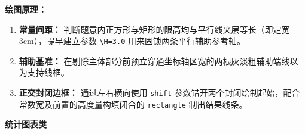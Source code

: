 \vspace{0.5cm}
\textbf{绘图原理：}
\begin{enumerate}
    \item \textbf{常量间距：} 判断题意内正方形与矩形的限高均与平行线夹层等长（即定宽 $3\text{cm}$），提早建立参数 \texttt{\textbackslash H=3.0} 用来固锁两条平行辅助参考轴。
    \item \textbf{辅助基准：} 在剔除主体部分前预立穿通坐标轴区宽的两根灰淡粗辅助端线以为支持线框。
    \item \textbf{正交封闭边框：} 通过左右横向使用 \texttt{shift} 参数错开两个封闭绘制起始，配合常数宽及前置的高度量构填闭合的 \texttt{rectangle} 制出结果线条。
\end{enumerate}

\vspace{2.5cm}
\begin{center}
\textbf{\huge 统计图表类}
\end{center}
\vspace{1cm}
